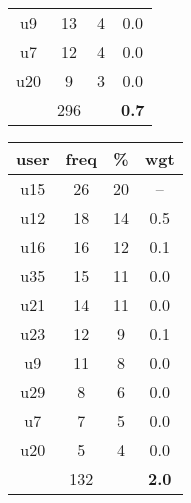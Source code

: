 \begin{appendices}
\begin{table}
\begin{tabular}{ |c|c|c|c| }
	u9 & 13 & 4 & 0.0 \\
	u7 & 12 & 4 & 0.0 \\
	u20 & 9 & 3 & 0.0 \\
	 & 296 & & \textbf{0.7} \\
	\hline
\end{tabular}
\begin{tabular}{ |c|c|c|c| }
	\hline
	\textbf{user} & \textbf{freq} & \textbf{\%} & \textbf{wgt} \\
	\hline
	u15 & 26 & 20 & -- \\
	u12 & 18 & 14 & 0.5 \\
	u16 & 16 & 12 & 0.1 \\
	u35 & 15 & 11 & 0.0 \\
	u21 & 14 & 11 & 0.0 \\
	u23 & 12 & 9 & 0.1 \\
	u9 & 11 & 8 & 0.0 \\
	u29 & 8 & 6 & 0.0 \\
	u7 & 7 & 5 & 0.0 \\
	u20 & 5 & 4 & 0.0 \\
	 & 132 & & \textbf{2.0} \\
	\hline
\end{tabular}
\end{table}


\end{appendices}
